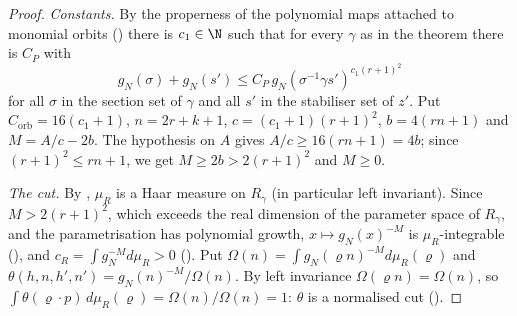 \begin{proof}
\emph{Constants.} By the properness of the polynomial maps attached to monomial orbits
() there is $c_1\in\N$ such that for every $\gamma$ as in the
theorem there is $C_P$ with
\begin{equation}\label{eq:pf:sh-curv:proper}
g_N(\sigma)+g_N(s')\le C_P\,g_N(\sigma^{-1}\gamma s')^{c_1(r+1)^2}
\end{equation}
for all $\sigma$ in the section set of $\gamma$ and all $s'$ in the stabiliser set of $z'$. Put $C_{\mathrm{orb}}=16(c_1+1)$,
$n=2r+k+1$, $c=(c_1+1)(r+1)^2$, $b=4(rn+1)$ and $M=A/c-2b$. The hypothesis on $A$ gives $A/c\ge16(rn+1)=4b$; since
$(r+1)^2\le rn+1$, we get $M\ge2b>2(r+1)^2$ and $M\ge0$.

\emph{The cut.} By , $\mu_R$ is a Haar measure on $R_\gamma$ (in
particular left invariant). Since $M>2(r+1)^2$, which exceeds the real dimension of the parameter space of $R_\gamma$, and the
parametrisation has polynomial growth, $x\mapsto g_N(x)^{-M}$ is $\mu_R$-integrable
(), and $c_R=\int g_N^{-M}d\mu_R>0$
(). Put $\Omega(n)=\int g_N(\varrho n)^{-M}d\mu_R(\varrho)$ and
$\theta(h,n,h',n')=g_N(n)^{-M}/\Omega(n)$. By left invariance $\Omega(\varrho n)=\Omega(n)$, so
$\int\theta(\varrho\cdot p)\,d\mu_R(\varrho)=\Omega(n)/\Omega(n)=1$: $\theta$ is a normalised cut
().


\end{proof}
